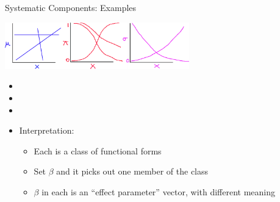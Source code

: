 \documentclass[12pt,ignorenonframetext,compress]{beamer}
\providecommand{\tightlist}{%
  \setlength{\itemsep}{0pt}\setlength{\parskip}{0pt}}
\begin{document}
\begin{frame}{Systematic Components: Examples}
\protect\hypertarget{systematic-components-examples}{}

\includegraphics[width=8cm]{figs/functionalForms}

\begin{itemize}
\item
\item
\item
\item
  Interpretation:

  \begin{itemize}
  \tightlist
  \item
    Each is a \alert{class of functional forms}
  \item
    Set \(\beta\) and it picks out one \alert{member of the class}
  \item
    \alert{$\beta$} in each is an ``effect parameter'' vector, with
    different meaning
  \end{itemize}
\end{itemize}

\end{frame}
\end{document}
